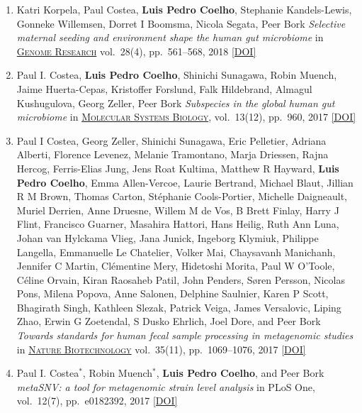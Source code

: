 \documentclass{article}
\newcommand\showdoi[1]{%
    \href{http://dx.doi.org/#1}{[DOI]}%
}
\newcommand\pubname[1]{\textsc{\uline{#1}}}
\newcommand\contribution[1]{\relax}
\newcommand\costar{${}^{*}$}
\begin{document}
\begin{enumerate}[resume]
\item Katri Korpela, Paul Costea, \textbf{Luis Pedro Coelho}, Stephanie
Kandels-Lewis, Gonneke Willemsen, Dorret I Boomsma, Nicola Segata, Peer Bork
\emph{Selective maternal seeding and environment shape the human gut
microbiome} in \pubname{Genome Research} vol.\ 28(4), pp.\ 561--568, 2018
\showdoi{10.1101/gr.233940.117}
\contribution{I contributed to the analysis and interpretation of the
metagenomics data.}

\item Paul I. Costea, \textbf{Luis Pedro Coelho}, Shinichi Sunagawa, Robin
Muench, Jaime Huerta-Cepas, Kristoffer Forslund, Falk Hildebrand, Almagul
Kushugulova, Georg Zeller, Peer Bork \emph{Subspecies in the global human gut
microbiome} in \pubname{Molecular Systems Biology}, vol.\ 13(12), pp.\ 960,
2017 \showdoi{10.15252/msb.20177589}
\contribution{I contributed to the analysis and interpretation of the
metagenomics data and discussions of statistical methodology.}


\item Paul I Costea, Georg Zeller, Shinichi Sunagawa, Eric Pelletier, Adriana
Alberti, Florence Levenez, Melanie Tramontano, Marja Driessen, Rajna Hercog,
Ferris-Elias Jung, Jens Roat Kultima, Matthew R Hayward, \textbf{Luis Pedro
Coelho}, Emma Allen-Vercoe, Laurie Bertrand, Michael Blaut, Jillian R M Brown,
Thomas Carton, Stéphanie Cools-Portier, Michelle Daigneault, Muriel Derrien,
Anne Druesne, Willem M de Vos, B Brett Finlay, Harry J Flint, Francisco
Guarner, Masahira Hattori, Hans Heilig, Ruth Ann Luna, Johan van Hylckama
Vlieg, Jana Junick, Ingeborg Klymiuk, Philippe Langella, Emmanuelle Le
Chatelier, Volker Mai, Chaysavanh Manichanh, Jennifer C Martin, Clémentine
Mery, Hidetoshi Morita, Paul W O'Toole, Céline Orvain, Kiran Raosaheb Patil,
John Penders, Søren Persson, Nicolas Pons, Milena Popova, Anne Salonen,
Delphine Saulnier, Karen P Scott, Bhagirath Singh, Kathleen Slezak, Patrick
Veiga, James Versalovic, Liping Zhao, Erwin G Zoetendal, S Dusko Ehrlich, Joel
Dore, and Peer Bork \emph{Towards standards for human fecal sample processing
in metagenomic studies} in \pubname{Nature Biotechnology} vol.\ 35(11), pp.\
1069--1076, 2017 \showdoi{10.1038/nbt.3960}
\contribution{I contributed in the computational analysis of the samples in the
benchmark.}

\item Paul I. Costea\costar, Robin Muench\costar, \textbf{Luis Pedro Coelho},
and Peer Bork \emph{metaSNV: a tool for metagenomic strain level analysis} in
PLoS One, vol.\ 12(7), pp.\ e0182392, 2017
\showdoi{10.1371/journal.pone.0182392}
\contribution{I contributed computer code for the proposed tool, ideas for the
design of the benchmark, and participated in the manuscript preparation.}


\end{enumerate}
\end{document}
